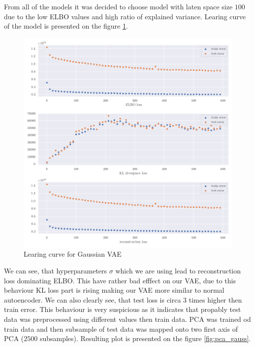 \documentclass[12pt,a4paper]{article}
\begin{document}
From all of the models it was decided to choose model with laten space size $100$ due to the low ELBO values and high ratio of explained variance. 
Learing curve of the model is presented on the figure \ref{fig:vanila_train}.
\begin{figure}[H]
    \begin{center}
        \includegraphics[scale=0.4]{src/vanila_VAE_training_100.png}
    \end{center}
    \caption{Learing curve for Gaussian VAE}
    \label{fig:vanila_train}
\end{figure}
We can see, that hyperparameters $\sigma$ which we are using lead to reconstruction loss dominating ELBO. This have rather bad efffect on our VAE,
due to this behaviour KL loss part is rising making our VAE more similar to normal autoencoder. We can also clearly see, that test loss is circa 3 times 
higher then train error. This behaviour is very suspicious as it indicates that propably test data was preprocessed using different values then train data. 
PCA was trained od train data and then subsample of test data was mapped onto two first axis of PCA ($2500$ subsamples). 
Resulting plot is presented on the figure \ref{fig:pca_gauss}.
\end{document}
